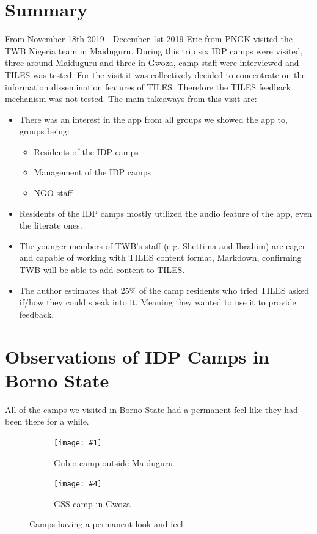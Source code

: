 \documentclass[11pt]{article}
\newcommand*{\twoImages}[8]{
	\begin{figure}[H]
		\centering
		  \begin{subfigure}{0.475\textwidth}
			\texttt{[image: \#1]}
			  \caption{#2}
			  \label{#3}
		  \end{subfigure}
		  \hfill
		  \begin{subfigure}{0.475\textwidth}
			\texttt{[image: \#4]}
			  \caption{#5}
			  \label{#6}
		  \end{subfigure}
	\caption{#7}
	\label{#8}
	\end{figure}
}
\begin{document}


\section*{Summary}
From November 18th 2019 - December 1st 2019 Eric from PNGK visited the TWB Nigeria team in Maiduguru. During this trip six IDP camps were visited, three around Maiduguru and three in Gwoza, camp staff were interviewed and TILES was tested. For the visit it was collectively decided to concentrate on the information dissemination features of TILES. Therefore the TILES feedback mechanism was not tested. The main takeaways from this visit are:
\begin{itemize}
	\item There was an interest in the app from all groups we showed the app to, groups being:
		\begin{itemize}
			\item Residents of the IDP camps
			\item Management of the IDP camps
			\item NGO staff
		\end{itemize}
	\item Residents of the IDP camps mostly utilized the audio feature of the app, even the literate ones.
	\item The younger members of TWB’s staff (e.g. Shettima and Ibrahim) are eager and capable of working with TILES content format, Markdown, confirming TWB will be able to add content to TILES.
	\item The author estimates that 25\% of the camp residents who tried TILES asked if/how they could speak into it. Meaning they wanted to use it to provide feedback.
\end{itemize}

\section{Observations of IDP Camps in Borno State}

All of the camps we visited in Borno State had a permanent feel like they had been there for a while. 

\twoImages{images/gubio_camp_tents.JPG}
{Gubio camp outside Maiduguru}
{}
{images/GSS_camp_tents.jpg}
{GSS camp in Gwoza}
{}
{Camps having a permanent look and feel}
{}
\end{document}
